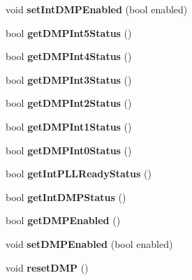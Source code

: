\begin{DoxyCompactItemize}
void {\bfseries set\+Int\+D\+M\+P\+Enabled} (bool enabled)
\item 
\mbox{\label{classMPU6050_a3a86756b7fe164e454f4801c30cdbffe}} 
bool {\bfseries get\+D\+M\+P\+Int5\+Status} ()
\item 
\mbox{\label{classMPU6050_a9d406fd5027e7a6b0e33f5bfafc67627}} 
bool {\bfseries get\+D\+M\+P\+Int4\+Status} ()
\item 
\mbox{\label{classMPU6050_a1ac1a70c4d207c93359b43e743d34839}} 
bool {\bfseries get\+D\+M\+P\+Int3\+Status} ()
\item 
\mbox{\label{classMPU6050_acaf41d1789aa02814af0319f71c57a9f}} 
bool {\bfseries get\+D\+M\+P\+Int2\+Status} ()
\item 
\mbox{\label{classMPU6050_a82a5a98ad80c69209ef0f423287b2f76}} 
bool {\bfseries get\+D\+M\+P\+Int1\+Status} ()
\item 
\mbox{\label{classMPU6050_a2b597f3f6b4188cbdb3feb2cd8dd3469}} 
bool {\bfseries get\+D\+M\+P\+Int0\+Status} ()
\item 
\mbox{\label{classMPU6050_a559de8cd420d329c93f215938e8483e2}} 
bool {\bfseries get\+Int\+P\+L\+L\+Ready\+Status} ()
\item 
\mbox{\label{classMPU6050_a715e66c52a2272b54782058772b50d61}} 
bool {\bfseries get\+Int\+D\+M\+P\+Status} ()
\item 
\mbox{\label{classMPU6050_a2a17e3062b1f321d260fd70f308c6a06}} 
bool {\bfseries get\+D\+M\+P\+Enabled} ()
\item 
\mbox{\label{classMPU6050_abb6bf6db86b84700c7f13bd838d63755}} 
void {\bfseries set\+D\+M\+P\+Enabled} (bool enabled)
\item 
\mbox{\label{classMPU6050_a7a9706f177e84b295739198e6b2ded95}} 
void {\bfseries reset\+D\+MP} ()
\item 
\mbox{\label{classMPU6050_aa0c1753f6d2dacb1942fbef156a075bc}} 

\end{DoxyCompactItemize}
